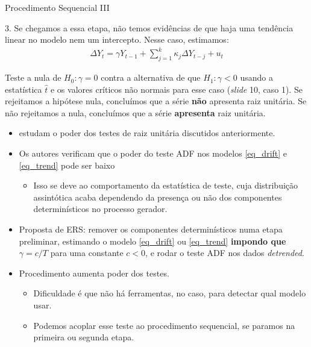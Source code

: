 \documentclass[11pt]{beamer}
\begin{document}
\begin{frame}{Procedimento Sequencial III}

		{ 3.}
		 Se chegamos a essa etapa, não temos evidências de que haja uma tendência linear no modelo nem um intercepto. Nesse caso, estimamos:
		\begin{equation*}
			\begin{aligned}
				\Delta Y_t = \gamma Y_{t-1} +  \sum_{j=1}^k \kappa_j \Delta Y_{t-j} + u_t
			\end{aligned}
		\end{equation*}
		
		Teste a nula de $H_0: \gamma = 0$ contra a alternativa de que $H_1: \gamma < 0$ usando a estatística $\hat{t}$ e os valores críticos não normais para esse caso (\textit{slide} 10, caso 1). Se rejeitamos a hipótese nula, concluímos que a série \textbf{não} apresenta raiz unitária. Se não rejeitamos a nula, concluímos que a série \textbf{apresenta} raiz unitária.
		

	
\end{frame}

\begin{frame}{\citet{Elliott1996} }
	\begin{itemize}
		\item \citet{Elliott1996} estudam o poder dos testes de raiz unitária discutidos anteriormente.
		\item Os autores verificam que o poder do teste ADF nos modelos \eqref{eq_drift} e \eqref{eq_trend} pode ser baixo
		\begin{itemize}
			\item Isso se deve ao comportamento da estatística de teste, cuja distribuição assintótica acaba dependendo da presença ou não dos componentes determinísticos no processo gerador.
		\end{itemize}
		\item Proposta de ERS: remover os componentes determinísticos numa etapa preliminar, estimando o modelo \eqref{eq_drift} ou \eqref{eq_trend} \textbf{impondo que} $\gamma = c/T$ para uma constante $c <0$, e rodar o teste ADF nos dados \textit{detrended}.
		\item Procedimento aumenta poder dos testes.
		\begin{itemize}
			\item Dificuldade é que não há ferramentas, no caso, para detectar qual modelo usar.
			\item Podemos acoplar esse teste ao procedimento sequencial, se paramos na primeira ou segunda etapa.
		\end{itemize} 
	\end{itemize}
\end{frame}
\end{document}
